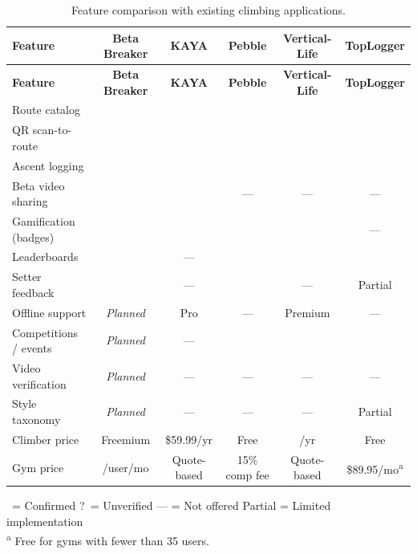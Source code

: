 \documentclass[12pt,a4paper]{report}
\renewcommand\_{\textunderscore\hspace{0pt}}
\newcommand{\cmark}{\ding{51}}
\newcommand{\qmark}{?}
\newcommand{\planned}{\textit{Planned}}
\newcommand{\notoffered}{---}
\begin{document}
\renewcommand{\arraystretch}{1.15}
\small
\begin{longtable}{l c c c c c}
\caption{Feature comparison with existing climbing applications.}\label{tab:benchmarking}\\
\hline
\textbf{Feature} & \textbf{Beta Breaker} & \textbf{KAYA} & \textbf{Pebble} & \textbf{Vertical-Life} & \textbf{TopLogger} \\
\hline
\endfirsthead
\hline
\textbf{Feature} & \textbf{Beta Breaker} & \textbf{KAYA} & \textbf{Pebble} & \textbf{Vertical-Life} & \textbf{TopLogger} \\
\hline
\endhead

Route catalog            & \cmark & \cmark & \cmark & \cmark & \cmark \\
QR scan-to-route         & \cmark & \cmark & \cmark & \cmark & \cmark \\
Ascent logging           & \cmark & \cmark & \cmark & \cmark & \cmark \\
Beta video sharing       & \cmark & \cmark & \notoffered & \notoffered & ---    \\
Gamification (badges)    & \cmark & \cmark & \cmark & \cmark & ---    \\
Leaderboards             & \cmark & \notoffered & \cmark & \cmark & \cmark \\
Setter feedback          & \cmark & \notoffered & \cmark & \notoffered & Partial \\
Offline support          & \planned & Pro    & \notoffered & Premium & \notoffered \\
Competitions / events    & \planned & \notoffered & \cmark & \cmark & \cmark \\
Video verification       & \planned & ---    & ---    & ---    & ---    \\
Style taxonomy           & \planned & ---    & ---    & ---    & Partial \\
\hline
Climber price            & Freemium & \$59.99/yr & Free & \texteuro59.88/yr & Free \\
Gym price                & \texteuro0.50/user/mo & Quote-based & 15\% comp fee & Quote-based & \$89.95/mo\textsuperscript{a} \\
\hline
\end{longtable}

\smallskip
\noindent\footnotesize
\cmark\ = Confirmed \quad \qmark\ = Unverified \quad --- = Not offered \quad Partial = Limited implementation\\
\textsuperscript{a} Free for gyms with fewer than 35 users.
\normalsize
\end{document}
